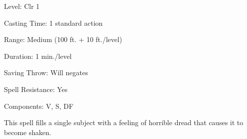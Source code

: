 
\begin{description*}
\item[Level:] Clr 1
\item[Casting Time:] 1 standard action
\item[Range:] Medium (100 ft. + 10 ft./level)
\item[Duration:] 1 min./level
\item[Saving Throw:] Will negates
\item[Spell Resistance:] Yes
\item[Components:] V, S, DF
\end{description*}

This spell fills a single subject with a feeling of horrible dread that causes
it to become shaken.